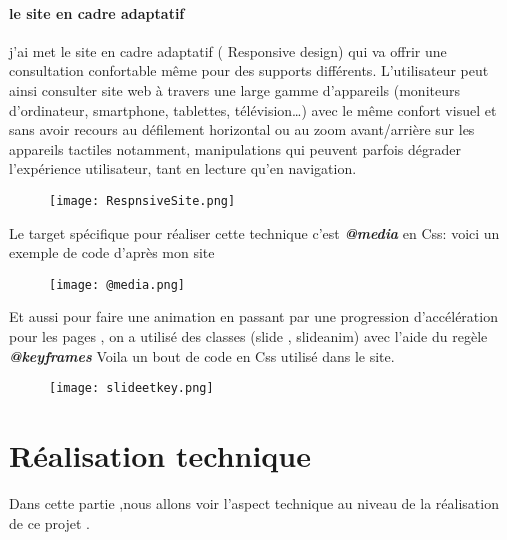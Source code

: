 \documentclass[a4paper,12pt]{report}
\begin{document}
\subsubsection{le site en cadre adaptatif}
\begin{tcolorbox}[fonttitle=\sffamily\bfseries\large,title= le site en cadre adaptatif (responsive)]
j'ai met le site en cadre adaptatif ( Responsive design) qui va offrir une consultation confortable même pour des supports différents. L'utilisateur peut ainsi consulter site web à travers une large gamme d'appareils (moniteurs d'ordinateur, smartphone, tablettes, télévision…) avec le même confort visuel et sans avoir recours au défilement horizontal ou au zoom avant/arrière sur les appareils tactiles notamment, manipulations qui peuvent parfois dégrader l'expérience utilisateur, tant en lecture qu'en navigation.
\end{tcolorbox}
\begin{figure}[H]
\begin{center}
\centering
\texttt{[image: RespnsiveSite.png]}
\end{center}
\label{responsive}
\end{figure}
Le target spécifique pour réaliser cette technique c'est \textbf{\textit{@media}} en Css:
voici un exemple de code d'après mon site
\begin{figure}[H]
\begin{center}
\centering
\texttt{[image: @media.png]}
\end{center}
\label{@media}
\end{figure}
Et aussi pour faire une animation en passant par une progression d'accélération pour les pages , on a utilisé des classes (slide , slideanim) avec l'aide du regèle \textbf{\textit{@keyframes }} Voila un bout de code en Css utilisé dans le site.
\begin{figure}[H]
\begin{center}
\centering
\texttt{[image: slideetkey.png]}
\end{center}
\label{@frame}
\end{figure}
\chapter{Réalisation technique}
Dans cette partie ,nous allons voir l'aspect technique au niveau de la réalisation de ce projet .
\end{document}
